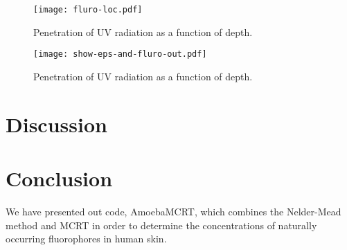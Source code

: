\begin{figure}[!htpb]
    \centering
    \texttt{[image: fluro-loc.pdf]}
    \caption{Penetration of UV radiation as a function of depth.}
    \label{fig:floc}
\end{figure}

\begin{figure}[!htpb]
    \centering
    \texttt{[image: show-eps-and-fluro-out.pdf]}
    \caption{Penetration of UV radiation as a function of depth.}
    \label{fig:epsfluro}
\end{figure}

\section{Discussion}
\section{Conclusion}

We have presented out code, AmoebaMCRT, which combines the Nelder-Mead method and MCRT in order to determine the concentrations of naturally occurring fluorophores in human skin.



